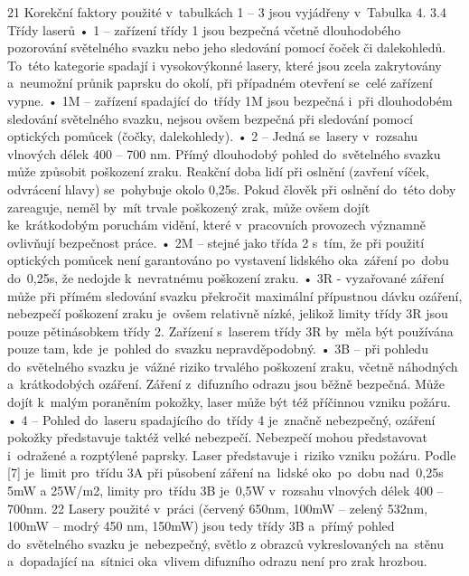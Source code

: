 21
Korekční faktory použité  v~tabulkách 1 – 3 jsou vyjádřeny  v~Tabulka 4.
3.4 Třídy laserů
• 1 – zařízení třídy 1 jsou bezpečná včetně dlouhodobého pozorování světelného
svazku nebo jeho sledování pomocí čoček či dalekohledů. To~této kategorie spadají
i vysokovýkonné lasery, které jsou zcela zakrytovány  a~neumožní průnik paprsku
do okolí, při případném otevření se~celé zařízení vypne.
• 1M – zařízení spadající do~třídy 1M jsou bezpečná  i~při dlouhodobém sledování
světelného svazku, nejsou ovšem bezpečná při sledování pomocí optických
pomůcek (čočky, dalekohledy).
• 2 – Jedná se~lasery  v~rozsahu vlnových délek 400 – 700 nm. Přímý dlouhodobý
pohled do~světelného svazku může způsobit poškození zraku. Reakční doba lidí při
oslnění (zavření víček, odvrácení hlavy) se~pohybuje okolo 0,25s. Pokud člověk při
oslnění do~této doby zareaguje, neměl by~mít trvale poškozený zrak, může ovšem
dojít ke~krátkodobým poruchám vidění, které  v~pracovních provozech významně
ovlivňují bezpečnost práce.
• 2M – stejné jako třída 2  s~tím, že při použití optických pomůcek není garantováno
po vystavení lidského  oka~záření po~dobu do~0,25s, že nedojde  k~nevratnému
poškození zraku.
• 3R - vyzařované záření může při přímém sledování svazku překročit maximální
přípustnou dávku ozáření, nebezpečí poškození zraku je~ovšem relativně nízké,
jelikož limity třídy 3R jsou pouze pětinásobkem třídy 2. Zařízení  s~laserem třídy
3R by~měla být používána pouze tam,  kde~je~pohled do~svazku nepravděpodobný.
• 3B – při pohledu do~světelného svazku je~vážné riziko trvalého poškození zraku,
včetně náhodných  a~krátkodobých ozáření. Záření  z~difuzního odrazu jsou běžně
bezpečná. Může dojít  k~malým poraněním pokožky, laser může být též příčinnou
vzniku požáru.
• 4 – Pohled do~laseru spadajícího do~třídy 4 je~značně nebezpečný, ozáření pokožky
představuje taktéž velké nebezpečí. Nebezpečí mohou představovat  i~odražené a
rozptýlené paprsky. Laser představuje  i~riziko vzniku požáru.
Podle [7] je~limit  pro~třídu 3A při působení záření na~lidské  oko~po~dobu  nad~0,25s 5mW a
25W/m2, limity  pro~třídu 3B je~0,5W  v~rozsahu vlnových délek 400 – 700nm.
22
Lasery použité  v~práci (červený 650nm, 100mW – zelený 532nm, 100mW – modrý 450
nm, 150mW) jsou tedy třídy 3B  a~přímý pohled do~světelného svazku je~nebezpečný, světlo z
obrazců vykreslovaných na~stěnu  a~dopadající na~sítnici  oka~vlivem difuzního odrazu není pro
zrak hrozbou.